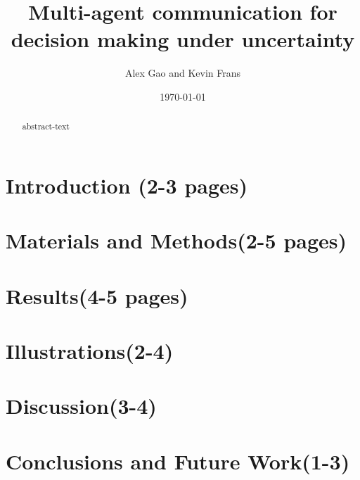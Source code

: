 \documentclass[11pt]{report}
\begin{document}
 
\title{Multi-agent communication for decision making under uncertainty}
\author{Alex Gao and Kevin Frans}
\date{\today}
\maketitle

\begin{abstract}
   abstract-text
\end{abstract}

\section{Introduction (2-3 pages)}

\section{Materials and Methods(2-5 pages)}

\section{Results(4-5 pages)}

\section{Illustrations(2-4)}

\section{Discussion(3-4)}

\section{Conclusions and Future Work(1-3)}
\end{document}
